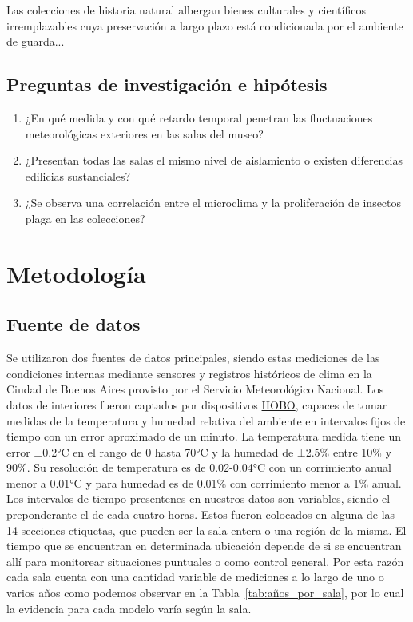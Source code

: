 \documentclass[11pt,a4paper]{article}
\begin{document}
Las colecciones de historia natural albergan bienes culturales y científicos irremplazables cuya preservación a largo plazo está condicionada por el ambiente de guarda...

\subsection{Preguntas de investigación e hipótesis}
\begin{enumerate}
    \item ¿En qué medida y con qué retardo temporal penetran las fluctuaciones meteorológicas exteriores en las salas del museo?
    \item ¿Presentan todas las salas el mismo nivel de aislamiento o existen diferencias edilicias sustanciales?
    \item ¿Se observa una correlación entre el microclima y la proliferación de insectos plaga en las colecciones?
\end{enumerate}

\section{Metodología}

\subsection{Fuente de datos}
Se utilizaron dos fuentes de datos principales, siendo estas mediciones de las condiciones internas mediante sensores y registros históricos de clima en la Ciudad de Buenos Aires provisto por el Servicio Meteorológico Nacional.
Los datos de interiores fueron captados por dispositivos \href{https://www.hobodataloggers.com/products/data-loggers/mx2301a?zCountry=AR}{HOBO}, capaces de tomar medidas de la temperatura y humedad relativa del ambiente en intervalos fijos de tiempo con un error aproximado de un minuto. La temperatura medida tiene un error ±0.2°C en el rango de 0 hasta 70°C y la humedad de ±2.5\% entre 10\% y 90\%. Su resolución de temperatura es de 0.02-0.04°C con un corrimiento anual menor a 0.01°C y para humedad es de 0.01\% con corrimiento menor a 1\% anual. Los intervalos de tiempo presentenes en nuestros datos son variables, siendo el preponderante el de cada cuatro horas.
Estos fueron colocados en alguna de las 14 secciones etiquetas, que pueden ser la sala entera o una región de la misma. El tiempo que se encuentran en determinada ubicación depende de si se encuentran allí para monitorear situaciones puntuales o como control general. Por esta razón cada sala cuenta con una cantidad variable de mediciones a lo largo de uno o varios años como podemos observar en la Tabla~\ref{tab:años_por_sala}, por lo cual la evidencia para cada modelo varía según la sala.
\end{document}
